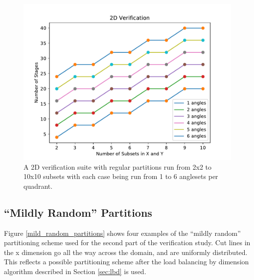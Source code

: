 \begin{figure}[H]
\centering
\includegraphics[scale=0.8]{../figures/regular_verification.pdf}
\caption{A 2D verification suite with regular partitions run from 2x2 to 10x10 subsets with each case being run from 1 to 6 anglesets per quadrant.}
\label{regular_verification}
\end{figure}

\subsection{``Mildly Random'' Partitions}
Figure \ref{mild_random_partitions} shows four examples of the ``mildly random'' partitioning scheme used for the second part of the verification study. Cut lines in the x dimension go all the way across the domain, and are uniformly distributed. This reflects a possible partitioning scheme after the load balancing by dimension algorithm described in Section \ref{sec:lbd} is used.

